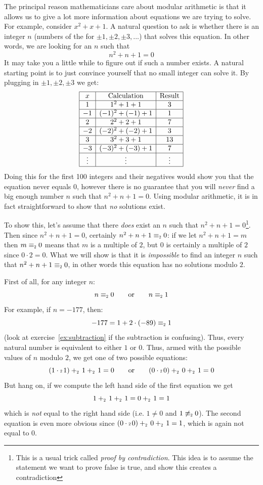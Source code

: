 \documentclass[oneside]{book}
\newcommand\scalemath[2]{\scalebox{#1}{\mbox{\ensuremath{\displaystyle #2}}}}
\newcommand{\Equiv}[1]{\equiv_{\scalemath{0.6}{#1}}}
\newcommand{\Plus}[1]{+_{\scalemath{0.6}{#1}}\,}
\newcommand{\Cdot}[1]{\cdot{\scalemath{0.6}{#1}}\,}
\begin{document}
The principal reason mathematicians care about modular arithmetic is that it allows us to give a lot more
information about equations we are trying to solve. For example, consider $x^2+x+1$. A natural question to ask
is whether there is an integer $n$ (numbers of the for
$\pm1, \pm2, \pm3, ...$) that solves this equation. In other words, we are looking for an $n$ such that
\[
  n^2+n+1 =0
  \]
It may take you a little while to figure out if such a number exists. A natural starting
point is to just convince yourself that no small integer can solve it. By plugging in
$\pm1, \pm2, \pm3$ we get:
\[
\begin{array}{|c|c|c|}
\hline
x & \text{Calculation} & \text{Result} \\
\hline
1 & 1^2 + 1 + 1 & 3 \\
\hline
-1 & (-1)^2 + (-1) + 1 & 1 \\
\hline
2 & 2^2 + 2 + 1 & 7 \\
\hline
-2 & (-2)^2 + (-2) + 1 & 3 \\
\hline
3 & 3^2 + 3 + 1 & 13 \\
\hline
-3 & (-3)^2 + (-3) + 1 & 7 \\
\hline
\vdots & \vdots & \vdots\\
\hline
\end{array}
\]
Doing this for the first 100 integers and their negatives would show you that the equation never equals $0$,
however there is no guarantee that you will \emph{never} find a big enough number $n$ such that $n^2+n+1=0$.
Using modular arithmetic, it is in fact straightforward to show that \emph{no} solutions exist.

To show this, let's assume that there \emph{does} exist an $n$ such that $n^2+n+1=0$\footnote{This is a usual
trick called \emph{proof by contradiction}. This idea is to assume the statement we want to prove false is
true, and show this creates a contradiction}. Then since $n^2+n+1=0$, certainly $n^2+n+1\Equiv{2}0$: if we let
$n^2+n+1=m$ then $m\Equiv{2} 0$ means that $m$ is a multiple of $2$, but $0$ is certainly a multiple of $2$
since $0\cdot 2=  0$. What we will show is that it is \emph{impossible} to find an integer $n$ such that
$n^2+n+1\Equiv{2}0$, in other words this equation has no solutions modulo $2$.

First of all, for any integer $n$:
\[
  n\Equiv{2} 0 \qquad \text{or} \qquad n\Equiv{2}1
\]
For example, if $n = -177$, then:
\[
  -177 = 1 + 2\cdot (-89) \Equiv{2} 1
\]
(look at exercise~\ref{ex:subtraction} if the subtraction is confusing). Thus, every natural number is
equivalent to either $1$ or $0$. Thus, armed with the
possible values of $n$ modulo $2$, we get one of two possible equations:
\[
  (1\Cdot{2}1) \Plus{2} 1 \Plus{2} 1 = 0 \qquad \text{or} \qquad (0\Cdot{2}0) \Plus{2}0\Plus{2} 1 = 0
\]
But hang on, if we compute the left hand side of the first equation we get
\[
  1\Plus{2}1\Plus{2}1 = 0\Plus{2}1 = 1
\]
which is \emph{not} equal to the right hand side (i.e. $1\ne 0$ and $1\not\Equiv{2}0$). The second equation is
even more obvious since $(0\Cdot{2}0) \Plus{2}0\Plus{2} 1 = 1$, which is again not equal to $0$.
\end{document}
